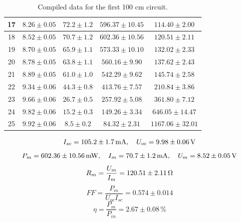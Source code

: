 \begin{table}[!h]
\begin{center}
\begin{tabular}{|c|c|c|c|c|}
\hline
17	&	$8.26 \pm 0.05$	&	$72.2 \pm 1.2$	&	$596.37 \pm 10.45$	&	$114.40 \pm 2.00$	\\
\hline
18	&	$8.52 \pm 0.05$	&	$70.7 \pm 1.2$	&	$602.36 \pm 10.56$	&	$120.51 \pm 2.11$	\\
\hline
19	&	$8.70 \pm 0.05$	&	$65.9 \pm 1.1$	&	$573.33 \pm 10.10$	&	$132.02 \pm 2.33$	\\
\hline
20	&	$8.78 \pm 0.05$	&	$63.8 \pm 1.1$	&	$560.16 \pm 9.90$	&	$137.62 \pm 2.43$	\\
\hline
21	&	$8.89 \pm 0.05$	&	$61.0 \pm 1.0$	&	$542.29 \pm 9.62$	&	$145.74 \pm 2.58$	\\
\hline
22	&	$9.34 \pm 0.06$	&	$44.3 \pm 0.8$	&	$413.76 \pm 7.57$	&	$210.84 \pm 3.86$	\\
\hline
23	&	$9.66 \pm 0.06$	&	$26.7 \pm 0.5$	&	$257.92 \pm 5.08$	&	$361.80 \pm 7.12$	\\
\hline
24	&	$9.82 \pm 0.06$	&	$15.2 \pm 0.3$	&	$149.26 \pm 3.34$	&	$646.05 \pm 14.47$	\\
\hline
25	&	$9.92 \pm 0.06$	&	$8.5 \pm 0.2$	&	$84.32 \pm 2.31$	&	$1167.06 \pm 32.01$	\\
\hline
\end{tabular}
\caption{Compiled data for the first 100 cm circuit.}
\label{tab-com-1}
\end{center}
\end{table}

$$I_{sc}=105.2\pm1.7\,{\rm mA},\quad U_{oc}=9.98\pm0.06\,{\rm V}$$
$$P_m=602.36\pm10.56\,{\rm mW},\quad I_m=70.7\pm1.2\,{\rm mA},\quad U_m=8.52\pm0.05\,{\rm V}$$
$$R_m=\frac{U_m}{I_m}=120.51\pm2.11\,{\rm \Omega}$$
$$FF=\frac{P_m}{U_{oc}I_{sc}}=0.574\pm0.014$$
$$\eta=\frac{P_m}{P_{in}}=2.67\pm0.08\,\%$$
$$$$

